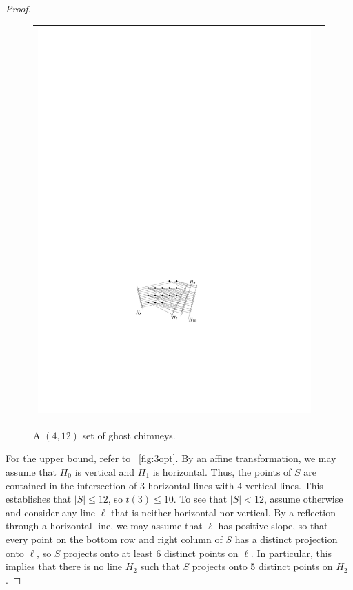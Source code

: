 \documentclass{ws-ijcga}
\begin{document}
\begin{proof}
\begin{figure}
\begin{center}
\begin{tabular}{c@{}c}
       \hspace{-1cm}\includegraphics{i4b.pdf}
    \end{tabular}
  \end{center}
  \caption{A $(4,12)$ set of ghost chimneys.}
  \label{fig:i4}
\end{figure}

For the upper bound, refer to \figurename~\ref{fig:3opt}.  By an affine transformation,
we may assume that $H_0$ is vertical and $H_1$ is horizontal.  Thus, the
points of $S$ are contained in the intersection of 3 horizontal lines
with 4 vertical lines.  This establishes that $|S|\le 12$, so $t(3) \le 10$.
To see that $|S|< 12$, assume otherwise and consider any line $\ell$ that
is neither horizontal nor vertical. By a reflection through a horizontal
line, we may assume that $\ell$ has positive slope, so that every point
on the bottom row and right column of $S$ has a distinct projection
onto $\ell$, so $S$ projects onto at least 6 distinct points on $\ell$.
In particular, this implies that there is no line $H_2$ such that $S$
projects onto 5 distinct points on $H_2$.
\end{proof}
\end{document}
